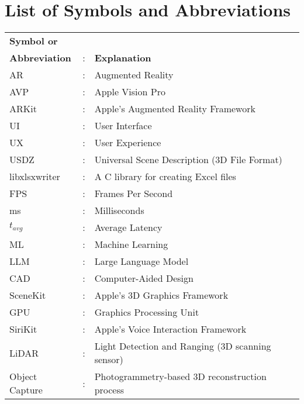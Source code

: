 \chapter*{List of Symbols and Abbreviations}

\begin{tabular}{lcl}
    \textbf{Symbol or}&&\\
    \textbf{Abbreviation} &:& \textbf{Explanation}\\
    AR &:& Augmented Reality\\
    AVP &:& Apple Vision Pro\\
    ARKit &:& Apple's Augmented Reality Framework\\
    UI &:& User Interface\\
    UX &:& User Experience\\
    USDZ &:& Universal Scene Description (3D File Format)\\
    libxlsxwriter &:& A C library for creating Excel files\\
    FPS &:& Frames Per Second\\
    ms &:& Milliseconds\\
    $t_{avg}$ &:& Average Latency\\
    ML &:& Machine Learning\\
    LLM &:& Large Language Model\\
    CAD &:& Computer-Aided Design\\
    SceneKit &:& Apple’s 3D Graphics Framework\\
    GPU &:& Graphics Processing Unit\\
    SiriKit &:& Apple’s Voice Interaction Framework\\
    LiDAR &:& Light Detection and Ranging (3D scanning sensor)\\
    Object Capture &:& Photogrammetry-based 3D reconstruction process\\
\end{tabular}

\clearpage
